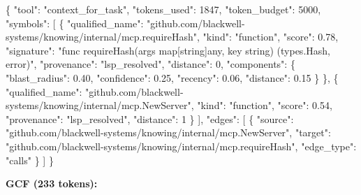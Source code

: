 \documentclass[
  11pt,
  paper=a4,
  ,captions=tableheading
]{scrartcl}
\newenvironment{Shaded}{}{}
\newcommand{\DataTypeTok}[1]{\textcolor[rgb]{0.56,0.13,0.00}{#1}}
\newcommand{\DecValTok}[1]{\textcolor[rgb]{0.25,0.63,0.44}{#1}}
\newcommand{\FloatTok}[1]{\textcolor[rgb]{0.25,0.63,0.44}{#1}}
\newcommand{\FunctionTok}[1]{\textcolor[rgb]{0.02,0.16,0.49}{#1}}
\newcommand{\OtherTok}[1]{\textcolor[rgb]{0.00,0.44,0.13}{#1}}
\newcommand{\StringTok}[1]{\textcolor[rgb]{0.25,0.44,0.63}{#1}}
\begin{document}
\begin{Shaded}
\begin{Highlighting}[]
\FunctionTok{\{}
  \DataTypeTok{"tool"}\FunctionTok{:} \StringTok{"context\_for\_task"}\FunctionTok{,}
  \DataTypeTok{"tokens\_used"}\FunctionTok{:} \DecValTok{1847}\FunctionTok{,}
  \DataTypeTok{"token\_budget"}\FunctionTok{:} \DecValTok{5000}\FunctionTok{,}
  \DataTypeTok{"symbols"}\FunctionTok{:} \OtherTok{[}
    \FunctionTok{\{}
      \DataTypeTok{"qualified\_name"}\FunctionTok{:} \StringTok{"github.com/blackwell{-}systems/knowing/internal/mcp.requireHash"}\FunctionTok{,}
      \DataTypeTok{"kind"}\FunctionTok{:} \StringTok{"function"}\FunctionTok{,}
      \DataTypeTok{"score"}\FunctionTok{:} \FloatTok{0.78}\FunctionTok{,}
      \DataTypeTok{"signature"}\FunctionTok{:} \StringTok{"func requireHash(args map[string]any, key string) (types.Hash, error)"}\FunctionTok{,}
      \DataTypeTok{"provenance"}\FunctionTok{:} \StringTok{"lsp\_resolved"}\FunctionTok{,}
      \DataTypeTok{"distance"}\FunctionTok{:} \DecValTok{0}\FunctionTok{,}
      \DataTypeTok{"components"}\FunctionTok{:} \FunctionTok{\{} \DataTypeTok{"blast\_radius"}\FunctionTok{:} \FloatTok{0.40}\FunctionTok{,} \DataTypeTok{"confidence"}\FunctionTok{:} \FloatTok{0.25}\FunctionTok{,} \DataTypeTok{"recency"}\FunctionTok{:} \FloatTok{0.06}\FunctionTok{,} \DataTypeTok{"distance"}\FunctionTok{:} \FloatTok{0.15} \FunctionTok{\}}
    \FunctionTok{\}}\OtherTok{,}
    \FunctionTok{\{}
      \DataTypeTok{"qualified\_name"}\FunctionTok{:} \StringTok{"github.com/blackwell{-}systems/knowing/internal/mcp.NewServer"}\FunctionTok{,}
      \DataTypeTok{"kind"}\FunctionTok{:} \StringTok{"function"}\FunctionTok{,}
      \DataTypeTok{"score"}\FunctionTok{:} \FloatTok{0.54}\FunctionTok{,}
      \DataTypeTok{"provenance"}\FunctionTok{:} \StringTok{"lsp\_resolved"}\FunctionTok{,}
      \DataTypeTok{"distance"}\FunctionTok{:} \DecValTok{1}
    \FunctionTok{\}}
  \OtherTok{]}\FunctionTok{,}
  \DataTypeTok{"edges"}\FunctionTok{:} \OtherTok{[}
    \FunctionTok{\{}
      \DataTypeTok{"source"}\FunctionTok{:} \StringTok{"github.com/blackwell{-}systems/knowing/internal/mcp.NewServer"}\FunctionTok{,}
      \DataTypeTok{"target"}\FunctionTok{:} \StringTok{"github.com/blackwell{-}systems/knowing/internal/mcp.requireHash"}\FunctionTok{,}
      \DataTypeTok{"edge\_type"}\FunctionTok{:} \StringTok{"calls"}
    \FunctionTok{\}}
  \OtherTok{]}
\FunctionTok{\}}
\end{Highlighting}
\end{Shaded}

\textbf{GCF (233 tokens):}
\end{document}
